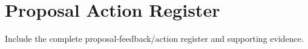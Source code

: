 \chapter{Proposal Action Register}
Include the complete proposal-feedback/action register and supporting evidence.
